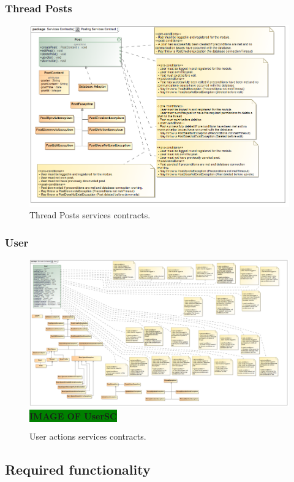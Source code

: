 \documentclass [a4paper,12pt] {article}
\begin{document}
		\subsubsection{Thread Posts}
		\begin{figure}[H]
			\centering
			\includegraphics[width=1.0\textwidth]{ThreadPostsSC.png}
			\caption{Thread Posts services contracts.}
		\end{figure}	
		\subsubsection{User}
			\begin{figure}[H]
				\centering
				\includegraphics[width=1.0\textwidth]{UserSC.png}
				\large\textbf{\colorbox{green}{IMAGE OF UserSC}}
				\caption{User actions services contracts.}
			\end{figure}
\pagebreak
	\subsection{Required functionality}
\end{document}
